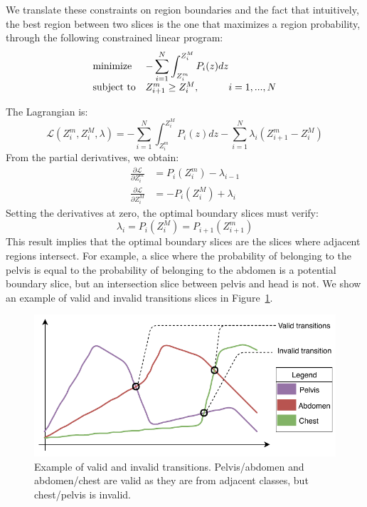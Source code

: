 We translate these constraints on region boundaries and the fact that intuitively, the best region between two slices is the one that maximizes a region probability, through the following constrained linear program:
\begin{equation}
    \begin{array}{ll@{}ll}
    \text{minimize}  & - \displaystyle\sum\limits_{i=1}^{N} \int_{Z_i^m}^{Z_i^M} P_i(z) dz &\\
    \text{subject to}&  Z^m_{i+1} \ge Z^M_i,  &i=1 ,..., N
    \end{array}
    \label{eq:optimal_boundary}
\end{equation}

The Lagrangian is:
\begin{equation}
    \mathcal{L} \left( Z_i^m, Z_i^M, \lambda \right) = - \displaystyle\sum\limits_{i=1}^{N} \int_{Z_i^m}^{Z_i^M} P_i(z) dz
                                                        - \displaystyle\sum\limits_{i=1}^{N} \lambda_i \left( Z^m_{i+1} - Z_i^M \right)
\end{equation}
From the partial derivatives, we obtain:
\begin{align*}
    \frac{\partial \mathcal{L}}{\partial Z_i^m} &= P_i \left( Z_i^m \right) - \lambda_{i-1} \\
    \frac{\partial \mathcal{L}}{\partial Z_i^M} &= - P_i \left( Z_i^M \right) + \lambda_{i}
\end{align*}
Setting the derivatives at zero, the optimal boundary slices must verify:
\begin{equation}
    \lambda_i = P_i \left( Z_i^M \right) = P_{i+1} \left( Z_{i+1}^m \right)
\end{equation}
This result implies that the optimal boundary slices are the slices where adjacent regions intersect. For example, a slice where the probability of belonging to the pelvis is equal to the probability of belonging to the abdomen is a potential boundary slice, but an intersection slice between pelvis and head is not. We show an example of valid and invalid transitions slices in Figure~\ref{fig:valid_transitions}.

\begin{figure}[htbp]
	\centering
	\includegraphics[width=\linewidth]{img_hyperopt/valid_transitions}
	\caption[Example of valid and invalid transitions]{Example of valid and invalid transitions. Pelvis/abdomen and abdomen/chest are valid as they are from adjacent classes, but chest/pelvis is invalid.}
	\label{fig:valid_transitions}
\end{figure}

